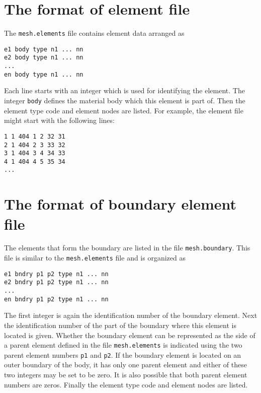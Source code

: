 \section{The format of element file}

The {\tt mesh.elements} file contains element data
arranged as
\begin{verbatim}
e1 body type n1 ... nn
e2 body type n1 ... nn
...
en body type n1 ... nn
\end{verbatim}
Each line starts with an integer which is used for identifying the element. 
The integer {\tt body} defines the material body which this element is part of.
Then the element type code and element nodes are listed. 
For example, the element file might start with the following lines: 
\begin{verbatim}
1 1 404 1 2 32 31
2 1 404 2 3 33 32
3 1 404 3 4 34 33
4 1 404 4 5 35 34
...
\end{verbatim}

\section{The format of boundary element file}

The elements that form the boundary are listed in the file {\tt mesh.boundary}.
This file is similar to the {\tt mesh.elements} file and is organized as
\begin{verbatim}
e1 bndry p1 p2 type n1 ... nn
e2 bndry p1 p2 type n1 ... nn
...
en bndry p1 p2 type n1 ... nn
\end{verbatim}
The first integer is again the identification number of the
boundary element. Next the identification number of the part of the boundary where 
this element is located is given. Whether the boundary element can be represented as 
the side of a parent element defined in the file {\tt mesh.elements} is indicated using
the two parent element numbers {\tt p1} and {\tt p2}.
If the boundary element is located on an outer boundary of the body, it has  
only one parent element and either of these two integers may be set to be zero.
It is also possible that both parent element numbers are zeros. 
Finally the element type code and element nodes are listed. 
